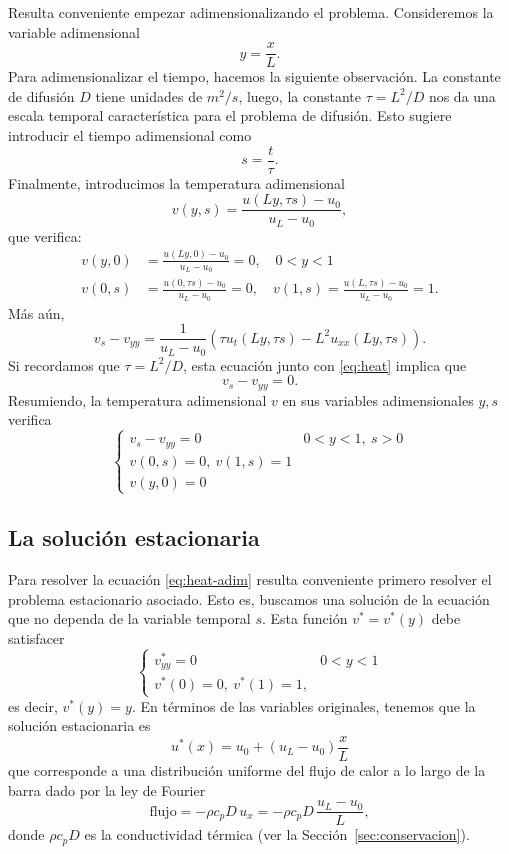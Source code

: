 \documentclass[12pt, a4paper]{amsbook}
\theoremstyle{remark}
\theoremstyle{definition}
\numberwithin{section}{chapter}
\numberwithin{subsection}{section}
\numberwithin{equation}{section}
\numberwithin{figure}{chapter}
\begin{document}
Resulta conveniente empezar adimensionalizando el problema. Consideremos la variable adimensional
$$
y=\frac{x}{L}.
$$
Para adimensionalizar el tiempo, hacemos la siguiente observación. La constante de difusión $D$ tiene unidades de $m^2/s$, luego, la constante $\tau=L^2/D$ nos da una escala temporal característica para el problema de difusión. Esto sugiere introducir el tiempo adimensional como
$$
s = \frac{t}{\tau}.
$$
Finalmente, introducimos la temperatura adimensional
$$
v(y,s) = \frac{u(Ly, \tau s)-u_0}{u_L-u_0},
$$
que verifica:
\begin{align*}
v(y, 0) &= \frac{u(Ly, 0)-u_0}{u_L-u_0} = 0,\quad 0<y<1\\
v(0,s) & = \frac{u(0, \tau s)-u_0}{u_L-u_0} = 0,\quad v(1,s) = \frac{u(L, \tau s)-u_0}{u_L-u_0} = 1.
\end{align*}
Más aún,
$$
v_s - v_{yy} = \frac{1}{u_L-u_0}(\tau u_t(Ly, \tau s) - L^2 u_{xx}(Ly, \tau s)).
$$
Si recordamos que $\tau=L^2/D$, esta ecuación junto con \eqref{eq:heat} implica que
$$
v_s - v_{yy} = 0.
$$
Resumiendo, la temperatura adimensional $v$ en sus variables adimensionales $y, s$ verifica
\begin{equation}\label{eq:heat-adim}
\begin{cases}
v_s - v_{yy} = 0 & 0<y<1,\ s>0\\
v(0,s) = 0,\ v(1,s)=1\\
v(y, 0)=0
\end{cases}
\end{equation}

\subsection*{La solución estacionaria} 
Para resolver la ecuación \eqref{eq:heat-adim} resulta conveniente primero resolver el problema estacionario asociado. Esto es, buscamos una solución de la ecuación que no dependa de la variable temporal $s$. Esta función $v^*=v^*(y)$ debe satisfacer
$$
\begin{cases}
 v^*_{yy} = 0 & 0<y<1\\
v^*(0) = 0,\ v^*(1)=1,
\end{cases}
$$
es decir, $v^*(y) = y$. En términos de las variables originales, tenemos que la solución estacionaria es
$$
u^*(x) = u_0 + (u_L-u_0)\frac{x}{L}
$$
que corresponde a una distribución uniforme del flujo de calor a lo largo de la barra dado por la ley de Fourier
$$
\text{flujo} = -\rho c_p D\, u_x = -\rho c_p D\,\frac{u_L-u_0}{L},
$$
donde $\rho c_p D$ es la conductividad térmica (ver la Sección~\ref{sec:conservacion}).
\end{document}
